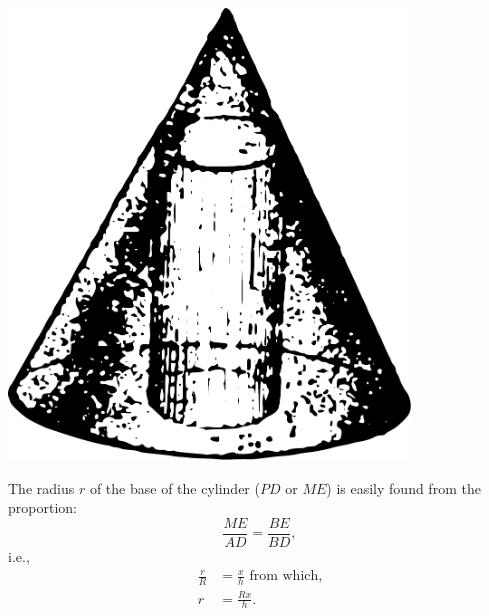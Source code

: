 \begin{marginfigure}[-7cm]%
\centering
\includegraphics[width=0.8\textwidth]{figures/ch-12/fig-186.pdf}
\end{marginfigure}
The radius \( r \) of the base of the cylinder ($PD$ or $ME$) is easily found from the proportion:
\begin{equation*}%
\frac{ME}{AD} = \frac{BE}{BD},
\end{equation*}
i.e.,
\begin{align*}%
\frac{r}{R} & = \frac{x}{h} \,\, \text{from which,}\\
 r & = \frac{Rx}{h}.
\end{align*}

